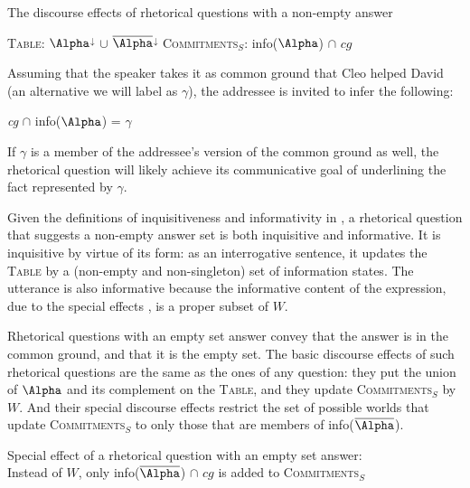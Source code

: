 \documentclass[output=paper,colorlinks,citecolor=brown            ,chinesefont]{langscibook}
\begin{document}
\begin{exe}
\ex\label{whRQ+shrink} The discourse effects of rhetorical questions with a non-empty answer
\begin{xlist}
\ex\label{whRQ+shrink1} \textsc{Table}: $\Alpha$$^\downarrow$ $\cup$ $\overline{\Alpha}$$^\downarrow$
\ex\label{whRQ+shrink2} \textsc{Commitments}$_S$: info($\Alpha$) $\cap$ $cg$
\end{xlist}
\end{exe}

Assuming that the speaker takes it as common ground that Cleo helped David (an alternative we will label as $\gamma$), the addressee is invited to infer the following:

\begin{exe}
\ex\label{whRQ+shrink3} \textit{cg} $\cap$ info($\Alpha$) = $\gamma$
\end{exe}

\noindent If $\gamma$ is a member of the addressee's version of the common ground as well, the rhetorical question will likely achieve its communicative goal of underlining the fact represented by $\gamma$.

Given the definitions of inquisitiveness and informativity in , a rhetorical question that suggests a non-empty answer set is both inquisitive and informative. It is inquisitive by virtue of its form: as an interrogative sentence, it updates the \textsc{Table} by a (non-empty and non-singleton) set of information states. The utterance is also informative because the informative content of the expression, due to the special effects , is a proper subset of $W$.

Rhetorical questions with an empty set answer convey that the answer is in the common ground, and that it is the empty set. The basic discourse effects of such rhetorical questions are the same as the ones of any question: they put the union of $\Alpha$ and its complement on the \textsc{Table}, and they update \textsc{Commitments}$_S$ by $W$. And their special discourse effects restrict the set of possible worlds that update \textsc{Commitments}$_S$ to only those that are members of info($\overline{\Alpha}$). 

\begin{exe}
\ex\label{whRQ-E} Special effect of a rhetorical question with an empty set answer: \\
Instead of $W$, only info($\overline{\Alpha}$) $\cap$ $cg$ is added to \textsc{Commitments}$_S$
\end{exe}
\end{document}
